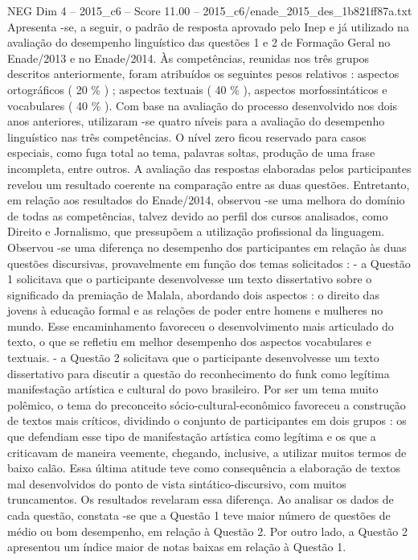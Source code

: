 \begin{textsample}{NEG Dim 4 – 2015\_c6 – Score 11.00 – 2015\_c6/enade\_2015\_des\_1b821ff87a.txt}
Apresenta -se, a seguir, o padrão de resposta aprovado pelo Inep e já utilizado na avaliação do desempenho linguístico das questões 1 e 2 de Formação Geral no Enade/2013 e no Enade/2014.
Às competências, reunidas nos três grupos descritos anteriormente, foram atribuídos os seguintes pesos relativos : aspectos ortográficos ( 20 \% ) ; aspectos textuais ( 40 \% ), aspectos morfossintáticos e vocabulares ( 40 \% ).
Com base na avaliação do processo desenvolvido nos dois anos anteriores, utilizaram -se quatro níveis para a avaliação do desempenho linguístico nas três competências.
O nível zero ficou reservado para casos especiais, como fuga total ao tema, palavras soltas, produção de uma frase incompleta, entre outros.
A avaliação das respostas elaboradas pelos participantes revelou um resultado coerente na comparação entre as duas questões.
Entretanto, em relação aos resultados do Enade/2014, observou -se uma melhora do domínio de todas as competências, talvez devido ao perfil dos cursos analisados, como Direito e Jornalismo, que pressupõem a utilização profissional da linguagem.
Observou -se uma diferença no desempenho dos participantes em relação às duas questões discursivas, provavelmente em função dos temas solicitados : - a Questão 1 solicitava que o participante desenvolvesse um texto dissertativo sobre o significado da premiação de Malala, abordando dois aspectos : o direito das jovens à educação formal e as relações de poder entre homens e mulheres no mundo.
Esse encaminhamento favoreceu o desenvolvimento mais articulado do texto, o que se refletiu em melhor desempenho dos aspectos vocabulares e textuais. - a Questão 2 solicitava que o participante desenvolvesse um texto dissertativo para discutir a questão do reconhecimento do funk como legítima manifestação artística e cultural do povo brasileiro.
Por ser um tema muito polêmico, o tema do preconceito sócio-cultural-econômico favoreceu a construção de textos mais críticos, dividindo o conjunto de participantes em dois grupos : os que defendiam esse tipo de manifestação artística como legítima e os que a criticavam de maneira veemente, chegando, inclusive, a utilizar muitos termos de baixo calão.
Essa última atitude teve como consequência a elaboração de textos mal desenvolvidos do ponto de vista sintático-discursivo, com muitos truncamentos.
Os resultados revelaram essa diferença.
Ao analisar os dados de cada questão, constata -se que a Questão 1 teve maior número de questões de médio ou bom desempenho, em relação à Questão 2.
Por outro lado, a Questão 2 apresentou um índice maior de notas baixas em relação à Questão 1.

\end{textsample}
